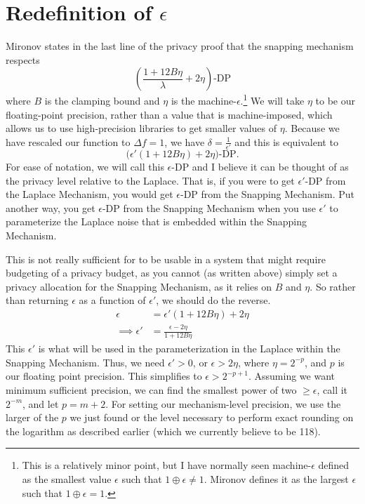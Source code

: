 \documentclass[11pt]{scrartcl} %
\begin{document}
\section{Redefinition of $\epsilon$}
Mironov states in the last line of the privacy proof that the snapping mechanism respects
\[ \left( \frac{1 + 12B\eta}{\lambda} + 2\eta \right)\text{-DP} \]
where $B$ is the clamping bound and $\eta$ is the machine-$\epsilon$.\footnote{This is a relatively minor point, but I have normally seen machine-$\epsilon$ defined as the smallest value $\epsilon$ such that $1 \oplus \epsilon \neq 1$. Mironov defines it as the largest $\epsilon$ such that $1 \oplus \epsilon = 1$.} We will take $\eta$ to be our floating-point precision, rather than a value that is machine-imposed, which allows us to use high-precision libraries to get smaller values of $\eta$.
Because we have rescaled our function to $\Delta f = 1$, we have $\delta = \frac{1}{\epsilon'}$ and this is equivalent to
\[ \big( \epsilon'(1 + 12B\eta) + 2\eta \big)\text{-DP}. \]
For ease of notation, we will call this $\epsilon$-DP and I believe it can be thought of as the privacy level relative to the Laplace. That is, if you were to get $\epsilon'$-DP from the Laplace Mechanism, you would get $\epsilon$-DP from the Snapping Mechanism. Put another way, you get $\epsilon$-DP from the Snapping Mechanism when you use $\epsilon'$ to parameterize the Laplace noise that is embedded within the Snapping Mechanism. \newline

This is not really sufficient for to be usable in a system that might require budgeting of a privacy budget, as you cannot (as written above) simply set a privacy allocation for the Snapping Mechanism, as it relies on $B$ and $\eta$. So rather than returning $\epsilon$ as a function of $\epsilon'$, we should do the reverse.
\begin{align}
             \epsilon &= \epsilon'(1 + 12B\eta) + 2\eta \nonumber \\
    \implies \epsilon' &= \frac{\epsilon - 2\eta}{1 + 12B \eta} \nonumber
\end{align}
This $\epsilon'$ is what will be used in the parameterization in the Laplace within the Snapping Mechanism. Thus, we need $\epsilon' > 0$, or $\epsilon > 2\eta$, where $\eta = 2^{-p}$, and $p$ is our floating point precision. This simplifies to $\epsilon > 2^{-p+1}$. Assuming we want minimum sufficient precision, we can find the smallest power of two $\geq \epsilon$, call it $2^{-m}$, and let $p = m+2$. For setting our mechanism-level precision, we use the larger of the $p$ we just found or the level necessary to perform exact rounding on the logarithm as described earlier (which we currently believe to be 118).
\end{document}
